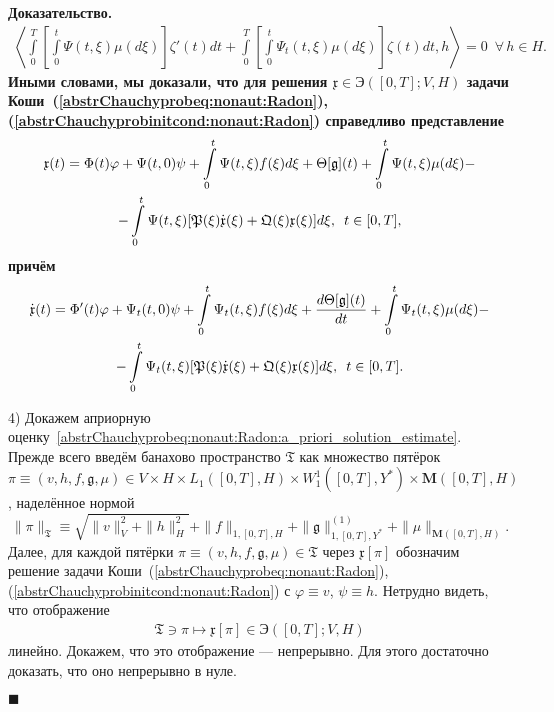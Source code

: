 \documentclass{report}
\newenvironment{Proof}{\par\noindent\bf Доказательство.\rm}{ $\blacksquare$\par}
\begin{document}
\begin{Proof}
\begin{gather*}
\left\langle\int\limits_0^T\left[\int\limits_{0}^{t}\Psi(t,\xi)\mu(d\xi)\right]\zeta'(t)dt+\int\limits_0^T\left[\int\limits_{0}^{t}\Psi_t(t,\xi)\mu(d\xi)\right]\zeta(t)dt,h \right\rangle=0\,\,\,\forall\,h\in H.
\end{gather*}
Иными словами, мы доказали, что для решения $\mathfrak{x}\in{\textrm{Э}}{}([0,T];V,H)$ задачи Коши~(\ref{abstrChauchyprobeq:nonaut:Radon}), (\ref{abstrChauchyprobinitcond:nonaut:Radon}) справедливо представление
\begin{gather}\label{x.representation}
\mathfrak{x}(t)=\Phi(t)\varphi+\Psi(t,0)\psi+\int\limits_0^t\Psi(t,\xi)f(\xi)d\xi+\Theta[\mathfrak{g}](t)+\int\limits_{0}^{t}\Psi(t,\xi)\mu(d\xi)-\\
\notag-\int\limits_0^t\Psi(t,\xi)[\mathfrak{P}(\xi)\dot{\mathfrak{x}}(\xi) + \mathfrak{Q}(\xi){\mathfrak{x}}(\xi)]d\xi,\,\,\,t\in[0,T],
\end{gather}
причём
\begin{gather}\label{dot.x.representation}
\dot{\mathfrak{x}}(t)=\Phi'(t)\varphi+\Psi_t(t,0)\psi+\int\limits_0^t\Psi_t(t,\xi)f(\xi)d\xi+\frac{d\Theta[\mathfrak{g}](t)}{dt}+\int\limits_{0}^{t}\Psi_t(t,\xi)\mu(d\xi)-\\
\notag-\int\limits_0^t\Psi_t(t,\xi)[\mathfrak{P}(\xi)\dot{\mathfrak{x}}(\xi) + \mathfrak{Q}(\xi){\mathfrak{x}}(\xi)]d\xi,\,\,\,t\in[0,T].
\end{gather}

4) Докажем априорную оценку~\eqref{abstrChauchyprobeq:nonaut:Radon:a_priori_solution_estimate}. Прежде всего введём банахово пространство $\mathfrak{T}$ как множество пятёрок $\pi\equiv(v,h,f,\mathfrak{g},\mu)\in V\times H\times L_1([0,T],H)\times W^1_1([0,T],Y^*)\times\mathbf{M}([0,T],H)$, наделённое нормой
$$
\|\pi\|_{\mathfrak{T}}\equiv\sqrt{\|v\|_V^2+\|h\|_H^2}+\|f\|_{1,[0,T],H}+\|\mathfrak{g}\|^{(1)}_{1,[0,T],Y^*}+\|\mu\|_{\mathbf{M}([0,T],H)}.
$$
Далее, для каждой пятёрки $\pi\equiv(v,h,f,\mathfrak{g},\mu)\in\mathfrak{T}$ через $\mathfrak{x}[\pi]$ обозначим решение задачи Коши~(\ref{abstrChauchyprobeq:nonaut:Radon}), (\ref{abstrChauchyprobinitcond:nonaut:Radon}) с $\varphi\equiv v$, $\psi\equiv h$. Нетрудно видеть, что отображение
\begin{gather}\label{pi.mapsto.x.pi:mapping}
\mathfrak{T}\ni\pi\mapsto\mathfrak{x}[\pi]\in{\textrm{Э}}{}([0,T];V,H)
\end{gather}
линейно. Докажем, что это отображение --- непрерывно. Для этого достаточно доказать, что оно непрерывно в нуле.


\end{Proof}
\end{document}
